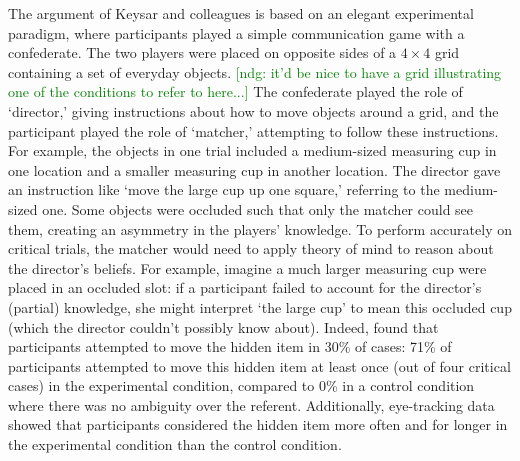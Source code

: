 \documentclass[10pt,letterpaper]{article}
\newcommand{\ndg}[1]{\textcolor{Green}{[ndg: #1]}}
\begin{document}
The argument of Keysar and colleagues is based on an elegant experimental paradigm, where participants played a simple communication game with a confederate. The two players were placed on opposite sides of a $4 \times 4$ grid containing a set of everyday objects.
\ndg{it'd be nice to have a grid illustrating one of the conditions to refer to here...}
The confederate played the role of `director,' giving instructions about how to move objects around a grid, and the participant played the role of `matcher,' attempting to follow these instructions. For example, the objects in one trial included a medium-sized measuring cup in one location and a smaller measuring cup in another location. The director gave an instruction like `move the large cup up one square,' referring to the medium-sized one. 
Some objects were occluded such that only the matcher could see them, creating an asymmetry in the players' knowledge. To perform accurately on critical trials, the matcher would need to apply theory of mind to reason about the director's beliefs. For example, imagine a much larger measuring cup were placed in an occluded slot: if a participant failed to account for the director's (partial) knowledge, she might interpret `the large cup' to mean this occluded cup (which the director couldn't possibly know about). 
Indeed,  found that participants attempted to move the hidden item in 30\% of cases: 71\% of participants attempted to move this hidden item at least once (out of four critical cases) in the experimental condition, compared to 0\% in a control condition where there was no ambiguity over the referent. 
Additionally, eye-tracking data showed that participants considered the hidden item more often and for longer in the experimental condition than the control condition. 
\end{document}
